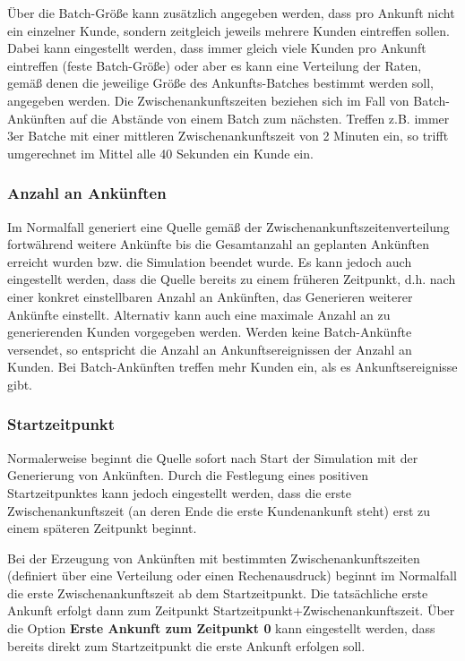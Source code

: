 Über die Batch-Größe kann zusätzlich
angegeben werden, dass pro Ankunft nicht ein einzelner Kunde, sondern zeitgleich jeweils
mehrere Kunden eintreffen sollen. Dabei kann eingestellt werden, dass immer gleich
viele Kunden pro Ankunft eintreffen (feste Batch-Größe) oder aber es kann eine Verteilung
der Raten, gemäß denen die jeweilige Größe des Ankunfts-Batches bestimmt werden soll,
angegeben werden.
Die Zwischenankunftszeiten beziehen sich im Fall von Batch-Ankünften auf die Abstände von
einem Batch zum nächsten. Treffen z.B. immer 3er Batche mit einer mittleren Zwischenankunftszeit
von 2 Minuten ein, so trifft umgerechnet im Mittel alle 40 Sekunden ein Kunde ein.

\subsubsection*{Anzahl an Ankünften}

Im Normalfall generiert eine Quelle gemäß der Zwischenankunftszeitenverteilung fortwährend
weitere Ankünfte bis die Gesamtanzahl an geplanten Ankünften erreicht wurden bzw. die Simulation beendet wurde.
Es kann jedoch auch eingestellt werden, dass die Quelle bereits zu einem früheren Zeitpunkt,
d.h. nach einer konkret einstellbaren Anzahl an Ankünften, das Generieren weiterer Ankünfte einstellt.
Alternativ kann auch eine maximale Anzahl an zu generierenden Kunden vorgegeben werden.
Werden keine Batch-Ankünfte versendet, so entspricht die Anzahl an Ankunftsereignissen der
Anzahl an Kunden. Bei Batch-Ankünften treffen mehr Kunden ein, als es Ankunftsereignisse gibt.

\subsubsection*{Startzeitpunkt}

Normalerweise beginnt die Quelle sofort nach Start der Simulation mit der Generierung von
Ankünften. Durch die Festlegung eines positiven Startzeitpunktes kann jedoch eingestellt
werden, dass die erste Zwischenankunftszeit (an deren Ende die erste Kundenankunft steht) erst
zu einem späteren Zeitpunkt beginnt.

Bei der Erzeugung von Ankünften mit bestimmten Zwischenankunftszeiten (definiert über eine Verteilung
oder einen Rechenausdruck) beginnt im Normalfall die erste Zwischenankunftszeit ab dem Startzeitpunkt.
Die tatsächliche erste Ankunft erfolgt dann zum Zeitpunkt Startzeitpunkt+Zwischenankunftszeit. Über
die Option \textbf{Erste Ankunft zum Zeitpunkt 0} kann eingestellt werden, dass bereits direkt zum
Startzeitpunkt die erste Ankunft erfolgen soll.

